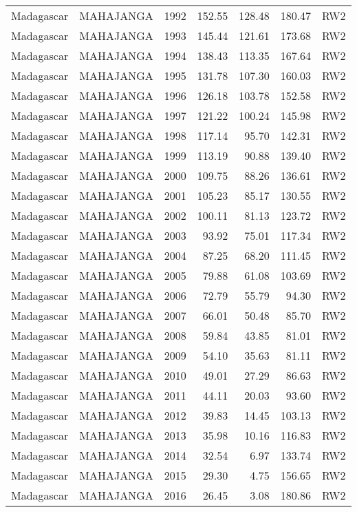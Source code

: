 \begin{longtable}{lllrrrl}
  Madagascar & MAHAJANGA & 1992 & 152.55 & 128.48 & 180.47 & RW2 \\ 
  Madagascar & MAHAJANGA & 1993 & 145.44 & 121.61 & 173.68 & RW2 \\ 
  Madagascar & MAHAJANGA & 1994 & 138.43 & 113.35 & 167.64 & RW2 \\ 
  Madagascar & MAHAJANGA & 1995 & 131.78 & 107.30 & 160.03 & RW2 \\ 
  Madagascar & MAHAJANGA & 1996 & 126.18 & 103.78 & 152.58 & RW2 \\ 
  Madagascar & MAHAJANGA & 1997 & 121.22 & 100.24 & 145.98 & RW2 \\ 
  Madagascar & MAHAJANGA & 1998 & 117.14 & 95.70 & 142.31 & RW2 \\ 
  Madagascar & MAHAJANGA & 1999 & 113.19 & 90.88 & 139.40 & RW2 \\ 
  Madagascar & MAHAJANGA & 2000 & 109.75 & 88.26 & 136.61 & RW2 \\ 
  Madagascar & MAHAJANGA & 2001 & 105.23 & 85.17 & 130.55 & RW2 \\ 
  Madagascar & MAHAJANGA & 2002 & 100.11 & 81.13 & 123.72 & RW2 \\ 
  Madagascar & MAHAJANGA & 2003 & 93.92 & 75.01 & 117.34 & RW2 \\ 
  Madagascar & MAHAJANGA & 2004 & 87.25 & 68.20 & 111.45 & RW2 \\ 
  Madagascar & MAHAJANGA & 2005 & 79.88 & 61.08 & 103.69 & RW2 \\ 
  Madagascar & MAHAJANGA & 2006 & 72.79 & 55.79 & 94.30 & RW2 \\ 
  Madagascar & MAHAJANGA & 2007 & 66.01 & 50.48 & 85.70 & RW2 \\ 
  Madagascar & MAHAJANGA & 2008 & 59.84 & 43.85 & 81.01 & RW2 \\ 
  Madagascar & MAHAJANGA & 2009 & 54.10 & 35.63 & 81.11 & RW2 \\ 
  Madagascar & MAHAJANGA & 2010 & 49.01 & 27.29 & 86.63 & RW2 \\ 
  Madagascar & MAHAJANGA & 2011 & 44.11 & 20.03 & 93.60 & RW2 \\ 
  Madagascar & MAHAJANGA & 2012 & 39.83 & 14.45 & 103.13 & RW2 \\ 
  Madagascar & MAHAJANGA & 2013 & 35.98 & 10.16 & 116.83 & RW2 \\ 
  Madagascar & MAHAJANGA & 2014 & 32.54 & 6.97 & 133.74 & RW2 \\ 
  Madagascar & MAHAJANGA & 2015 & 29.30 & 4.75 & 156.65 & RW2 \\ 
  Madagascar & MAHAJANGA & 2016 & 26.45 & 3.08 & 180.86 & RW2 \\ 

\end{longtable}
